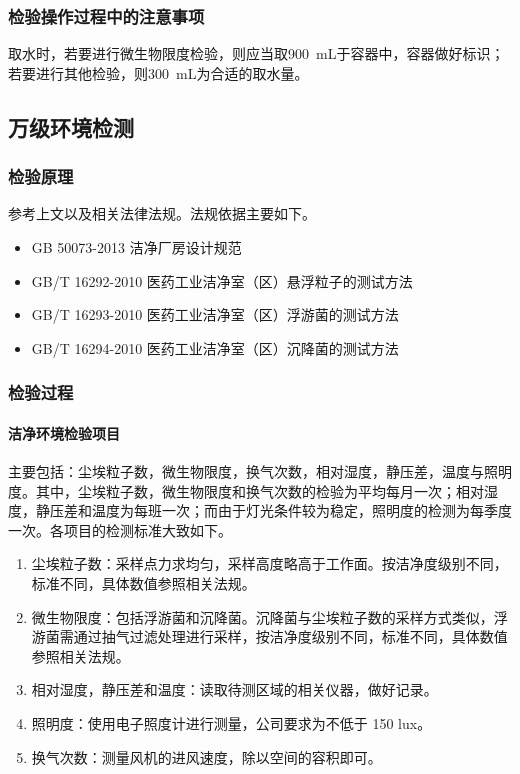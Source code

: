 \documentclass[cn,black,12pt,normal]{elegantnote}
\begin{document}
\subsubsection{检验操作过程中的注意事项}
取水时，若要进行微生物限度检验，则应当取\SI{900}{\milli\liter}于容器中，容器做好标识；若要进行其他检验，则\SI{300}{\milli\liter}为合适的取水量。

\subsection{万级环境检测}

\subsubsection{检验原理}
参考上文以及相关法律法规。法规依据主要如下。
\begin{itemize}
    \item GB 50073-2013 洁净厂房设计规范
    \item GB/T 16292-2010 医药工业洁净室（区）悬浮粒子的测试方法
    \item GB/T 16293-2010 医药工业洁净室（区）浮游菌的测试方法
    \item GB/T 16294-2010 医药工业洁净室（区）沉降菌的测试方法
\end{itemize}

\subsubsection{检验过程}
\paragraph{洁净环境检验项目} 主要包括：尘埃粒子数，微生物限度，换气次数，相对湿度，静压差，温度与照明度。其中，尘埃粒子数，微生物限度和换气次数的检验为平均每月一次；相对湿度，静压差和温度为每班一次；而由于灯光条件较为稳定，照明度的检测为每季度一次。各项目的检测标准大致如下。

\begin{enumerate}
    \item 尘埃粒子数：采样点力求均匀，采样高度略高于工作面。按洁净度级别不同，标准不同，具体数值参照相关法规。
    \item 微生物限度：包括浮游菌和沉降菌。沉降菌与尘埃粒子数的采样方式类似，浮游菌需通过抽气过滤处理进行采样，按洁净度级别不同，标准不同，具体数值参照相关法规。
    \item 相对湿度，静压差和温度：读取待测区域的相关仪器，做好记录。
    \item 照明度：使用电子照度计进行测量，公司要求为不低于 150 lux。
    \item 换气次数：测量风机的进风速度，除以空间的容积即可。
\end{enumerate}
\end{document}
